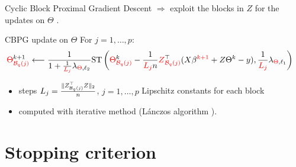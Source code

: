 \documentclass[10pt,aspectratio=43]{beamer}
\begin{document}
\begin{frame}{Cyclic Block Proximal Gradient Descent}
$\Longrightarrow$ exploit the blocks in $Z$ for the updates on $\Theta$
.

\begin{block}{CBPG update on $\Theta$}
For $j=1,\dots,p$:
\begin{align*}
\textcolor{red}{\Theta}_{\textcolor{red}{\mathcal{B}_{q}(j)}}^{k+1} & \longleftarrow \frac{1}{1 +
\frac{1}{\textcolor{red}{L_j}} \lambda_{\textcolor{red}{\Theta}, \ell_2}}
\mathrm{ST}
\left( \textcolor{red}{\Theta}_{\textcolor{red}{\mathcal{B}_{q}(j)}}^k - \frac{1}{\textcolor{red}{L_j} n}
\textcolor{red}{Z}_{\textcolor{red}{\mathcal{B}_{q}(j)}}^\top (X\beta^{\textcolor{red}{k+1}} + Z\Theta^k - y),
\frac{1}{\textcolor{red}{L_j}}\lambda_{\textcolor{red}{\Theta}, \ell_1}
\right)
\end{align*}
\end{block}

\begin{itemize}
    \item steps $L_j=\tfrac{\|Z_{\mathcal{B}_{q}(j)}^\top Z\|_2}{n}$, $j=1,\dots,p$ Lipschitz constants for each block
    \item computed with iterative method (L\'{a}nczos algorithm ).
\end{itemize}
\end{frame}


\section{Stopping criterion}
\label{sec:Stopping_criterion}
\end{document}
